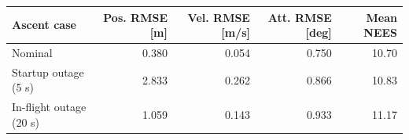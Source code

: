 \begin{tabularx}{\textwidth}{Yrrrr}\toprule
Ascent case & Pos. RMSE [m] & Vel. RMSE [m/s] & Att. RMSE [deg] & Mean NEES\\\midrule
Nominal & 0.380 & 0.054 & 0.750 & 10.70\\
Startup outage (5 s) & 2.833 & 0.262 & 0.866 & 10.83\\
In-flight outage (20 s) & 1.059 & 0.143 & 0.933 & 11.17\\
\bottomrule\end{tabularx}
